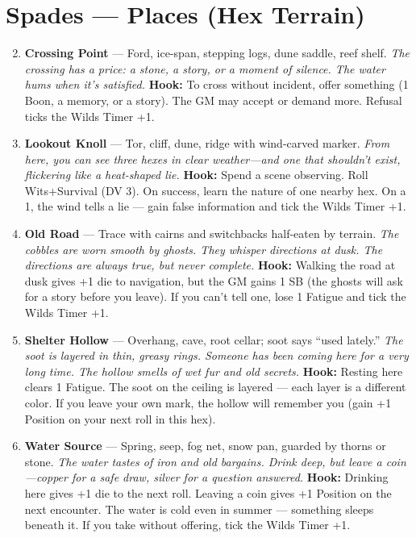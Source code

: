 \section*{Spades --- Places (Hex Terrain)}
\label{sec:wilderness-places}
\begin{enumerate}
\setcounter{enumi}{1}
\item \textbf{Crossing Point} --- Ford, ice-span, stepping logs, dune saddle, reef shelf.
  \hfill \textit{The crossing has a price: a stone, a story, or a moment of silence. The water hums when it's satisfied.}
  \textbf{Hook:} To cross without incident, offer something (1 Boon, a memory, or a story). The GM may accept or demand more. Refusal ticks the Wilds Timer +1.
  
\item \textbf{Lookout Knoll} --- Tor, cliff, dune, ridge with wind-carved marker.
  \hfill \textit{From here, you can see three hexes in clear weather---and one that shouldn't exist, flickering like a heat-shaped lie.}
  \textbf{Hook:} Spend a scene observing. Roll Wits+Survival (DV 3). On success, learn the nature of one nearby hex. On a 1, the wind tells a lie --- gain false information and tick the Wilds Timer +1.
  
\item \textbf{Old Road} --- Trace with cairns and switchbacks half-eaten by terrain.
  \hfill \textit{The cobbles are worn smooth by ghosts. They whisper directions at dusk. The directions are always true, but never complete.}
  \textbf{Hook:} Walking the road at dusk gives +1 die to navigation, but the GM gains 1 SB (the ghosts will ask for a story before you leave). If you can't tell one, lose 1 Fatigue and tick the Wilds Timer +1.
  
\item \textbf{Shelter Hollow} --- Overhang, cave, root cellar; soot says ``used lately.''
  \hfill \textit{The soot is layered in thin, greasy rings. Someone has been coming here for a very long time. The hollow smells of wet fur and old secrets.}
  \textbf{Hook:} Resting here clears 1 Fatigue. The soot on the ceiling is layered --- each layer is a different color. If you leave your own mark, the hollow will remember you (gain +1 Position on your next roll in this hex).
  
\item \textbf{Water Source} --- Spring, seep, fog net, snow pan, guarded by thorns or stone.
  \hfill \textit{The water tastes of iron and old bargains. Drink deep, but leave a coin---copper for a safe draw, silver for a question answered.}
  \textbf{Hook:} Drinking here gives +1 die to the next roll. Leaving a coin gives +1 Position on the next encounter. The water is cold even in summer --- something sleeps beneath it. If you take without offering, tick the Wilds Timer +1.
  

\end{enumerate}
